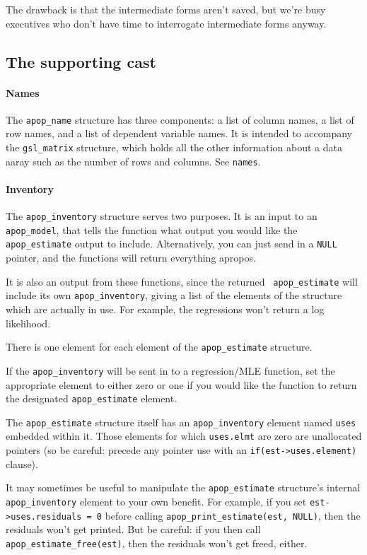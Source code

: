The drawback is that the intermediate forms aren't saved, but we're busy
executives who don't have time to interrogate intermediate forms anyway.

\subsection{The supporting cast}
\paragraph{Names}
The {\tt apop\_name} structure has three components: a list of column
names, a list of row names, and a list of dependent variable names. It
is intended to accompany the {\tt gsl\_matrix} structure, which holds
all the other information about a data aaray such as the number of rows
and columns.  See {\tt names}.

\paragraph{Inventory}
The {\tt apop\_inventory} structure serves two purposes. It is an input
to an {\tt apop\_\-model}, that tells the function what output you
would like the {\tt apop\_\-estimate} output to include.  Alternatively, you
can just send in a {\tt NULL} pointer, and the functions will return
everything apropos.

It is also an output from these functions, since the returned {\tt
apop\_\-estimate} will include its own {\tt apop\_\-in\-ventory},
giving a list of the elements of the structure which are
actually in use. For example, the regressions won't return a log
likelihood.

There is one element for each element of the {\tt apop\_estimate} structure.

If the {\tt apop\_inventory} will be sent in to a regression/MLE
function, set the appropriate element to either zero or one if you would
like the function to return the designated {\tt apop\_estimate} element.

The {\tt apop\_estimate} structure itself has an {\tt apop\_inventory}
element named {\tt uses} embedded within it. Those elements for
which {\tt uses.elmt} are zero are unallocated pointers (so be careful:
precede any pointer use with an {\tt if(est->uses.element)} clause).

It may sometimes be useful to manipulate the {\tt apop\_estimate} structure's
internal {\tt apop\_\-inventory} element to your own benefit. For
example, if you set {\tt est->uses.residuals = 0} before calling
{\tt apop\_\-print\_\-estimate(est, NULL)}, then the residuals won't get
printed. But be careful: if you then call {\tt apop\_\-estimate\_\-free(est)},
then the residuals won't get freed, either.

